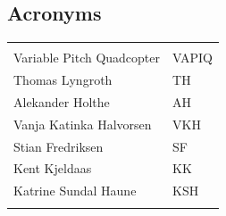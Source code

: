 \documentclass{article}
\begin{document}
\vspace*{3.0 cm}

\begin{center}
\section*{\textbf{Acronyms}}
\begin{tabular}{ll}
\rowcolor{cadetgrey}
    &   \\
Variable Pitch Quadcopter   & VAPIQ \\\rowcolor{gainsboro}
Thomas Lyngroth       & TH          \\ 
Alekander Holthe      & AH          \\\rowcolor{gainsboro}
Vanja Katinka Halvorsen     & VKH   \\
Stian Fredriksen      & SF          \\\rowcolor{gainsboro}
Kent Kjeldaas         & KK          \\
Katrine Sundal Haune  & KSH         \\\rowcolor{gainsboro}
\end{tabular}                                                             
\end{center}
\newpage




%


\tableofcontents
\newpage


%

%

%

%
\end{document}
